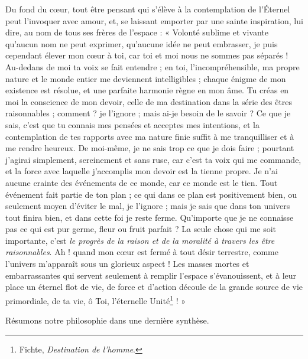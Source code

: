 \documentclass[a4paper, 11pt, oneside]{article}
\begin{document}
Du fond du cœur, tout être pensant qui s'élève à la contemplation de l'Éternel peut l'invoquer avec amour, et, se laissant emporter par une sainte inspiration, lui dire, au nom de tous ses frères de l'espace : « Volonté sublime et vivante qu'aucun nom ne peut exprimer, qu'aucune idée ne peut embrasser, je puis cependant élever mon cœur à toi, car toi et moi nous ne sommes pas séparés ! Au-dedans de moi ta voix se fait entendre ; en toi, l'incompréhensible, ma propre nature et le monde entier me deviennent intelligibles ; chaque énigme de mon existence est résolue, et une parfaite harmonie règne en mon âme. Tu créas en moi la conscience de mon devoir, celle de ma destination dans la série des êtres raisonnables ; comment ? je l'ignore ; mais ai-je besoin de le savoir ? Ce que je sais, c'est que tu connais mes pensées et acceptes mes intentions, et la contemplation de tes rapports avec ma nature finie suffit à me tranquilliser et à me rendre heureux. De moi-même, je ne sais trop ce que je dois faire ; pourtant j'agirai simplement, sereinement et sans ruse, car c'est ta voix qui me commande, et la force avec laquelle j'accomplis mon devoir est la tienne propre. Je n'ai aucune crainte des événements de ce monde, car ce monde est le tien. Tout événement fait partie de ton plan ; ce qui dans ce plan est positivement bien, ou seulement moyen d'éviter le mal, je l'ignore ; mais je sais que dans ton univers tout finira bien, et dans cette foi je reste ferme. Qu'importe que je ne connaisse pas ce qui est pur germe, fleur ou fruit parfait ? La seule chose qui me soit importante, c'est \emph{le progrès de la raison et de la moralité à travers les être raisonnables}. Ah ! quand mon cœur est fermé à tout désir terrestre, comme l'univers m'apparaît sous un glorieux aspect ! Les masses mortes et embarrassantes qui servent seulement à remplir l'espace s'évanouissent, et à leur place un éternel flot de vie, de force et d'action découle de la grande source de vie primordiale, de ta vie, ô Toi, l'éternelle Unité\footnote{Fichte, \emph{Destination de l'homme}.} ! »

Résumons notre philosophie dans une dernière synthèse.
\end{document}
